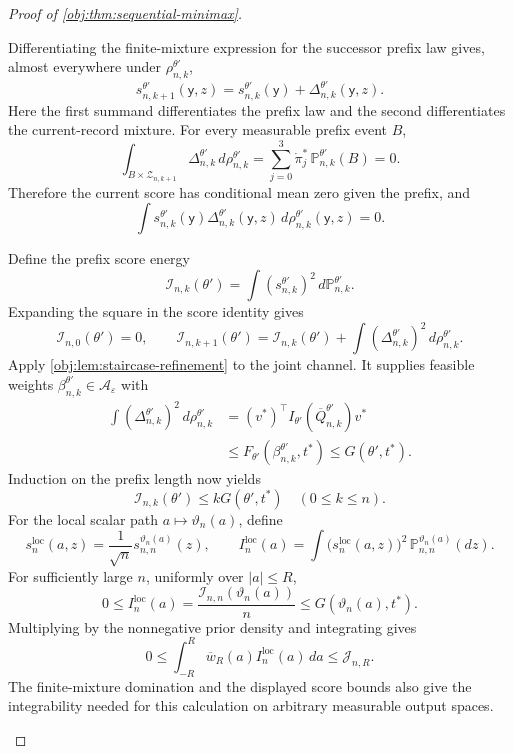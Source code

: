 \begin{proof}[Proof of \cref{obj:thm:sequential-minimax}]
\begin{enumerate}
Differentiating the finite-mixture expression for the successor prefix law gives, almost everywhere under \(\rho_{n,k}^{\theta'}\),
\[
s_{n,k+1}^{\theta'}(\mathsf y,z)
=
s_{n,k}^{\theta'}(\mathsf y)
+
\Delta_{n,k}^{\theta'}(\mathsf y,z).
\]
Here the first summand differentiates the prefix law and the second differentiates the current-record mixture. For every measurable prefix event \(B\),
\[
\int_{B\times\mathcal Z_{n,k+1}}
\Delta_{n,k}^{\theta'}\,d\rho_{n,k}^{\theta'}
=
\sum_{j=0}^3\dot\pi_j^*\,
\mathbb P_{n,k}^{\theta'}(B)
=
0.
\]
Therefore the current score has conditional mean zero given the prefix, and
\[
\int
s_{n,k}^{\theta'}(\mathsf y)\Delta_{n,k}^{\theta'}(\mathsf y,z)
\,d\rho_{n,k}^{\theta'}(\mathsf y,z)
=
0.
\]

Define the prefix score energy
\[
\mathcal I_{n,k}(\theta')
=
\int (s_{n,k}^{\theta'})^2\,d\mathbb P_{n,k}^{\theta'}.
\]
Expanding the square in the score identity gives
\[
\mathcal I_{n,0}(\theta')=0,
\qquad
\mathcal I_{n,k+1}(\theta')
=
\mathcal I_{n,k}(\theta')
+
\int(\Delta_{n,k}^{\theta'})^2\,d\rho_{n,k}^{\theta'}.
\]
Apply \cref{obj:lem:staircase-refinement} to the joint channel. It supplies feasible weights
\(\beta_{n,k}^{\theta'}\in\mathcal A_\varepsilon\) with
\[
\begin{aligned}
\int(\Delta_{n,k}^{\theta'})^2\,d\rho_{n,k}^{\theta'}
&=(v^*)^\top
I_{\theta'}(\overline Q_{n,k}^{\theta'})v^*\\
&\le F_{\theta'}(\beta_{n,k}^{\theta'},t^*)
\le G(\theta',t^*).
\end{aligned}
\]
Induction on the prefix length now yields
\[
\mathcal I_{n,k}(\theta')\le kG(\theta',t^*)
\quad(0\le k\le n).
\]
For the local scalar path \(a\mapsto\vartheta_n(a)\), define
\[
s_n^{\mathrm{loc}}(a,z)
=
\frac{1}{\sqrt n}s_{n,n}^{\vartheta_n(a)}(z),
\qquad
I_n^{\mathrm{loc}}(a)
=
\int\bigl(s_n^{\mathrm{loc}}(a,z)\bigr)^2
\,\mathbb P_{n,n}^{\vartheta_n(a)}(dz).
\]
For sufficiently large \(n\), uniformly over \(|a|\le R\),
\[
0\le I_n^{\mathrm{loc}}(a)
=
\frac{\mathcal I_{n,n}(\vartheta_n(a))}{n}
\le G(\vartheta_n(a),t^*).
\]
Multiplying by the nonnegative prior density and integrating gives
\[
0\le
\int_{-R}^{R}\overline w_R(a)I_n^{\mathrm{loc}}(a)\,da
\le\mathcal J_{n,R}.
\]
The finite-mixture domination and the displayed score bounds also give the integrability needed for this calculation on arbitrary measurable output spaces.


\end{enumerate}
\end{proof}
